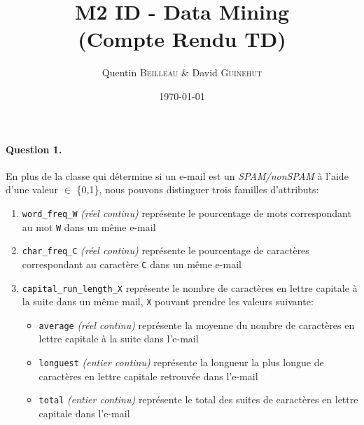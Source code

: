 \documentclass[a4paper,11pt]{article}
\title{M2 ID - Data Mining \\ \normalsize (Compte Rendu TD)}
\author{Quentin \textsc{Beilleau} \& David \textsc{Guinehut}}
\date{\today}
\begin{document}
	\renewcommand{\headrulewidth}{0.001pt}
	
	\pagestyle{fancy}
	
	\maketitle


\paragraph{Question 1.} En plus de la classe qui détermine si un e-mail est un \emph{SPAM/nonSPAM} à l'aide d'une valeur $\in$ \{0,1\}, nous pouvons distinguer trois familles d'attributs:

\begin{enumerate}
	\item \texttt{word\_freq\_W} \emph{(réel continu)} représente le pourcentage de mots correspondant au mot \texttt{W} dans un même e-mail
	\item \texttt{char\_freq\_C} \emph{(réel continu)} représente le pourcentage de caractères correspondant au caractère \texttt{C} dans un même e-mail
	\item \texttt{capital\_run\_length\_X} représente le nombre de caractères en lettre capitale à la suite dans un même mail, \texttt{X} pouvant prendre les valeurs suivante:
	\begin{itemize}
		\item \texttt{average} \emph{(réel continu)} représente la moyenne du nombre de caractères en lettre capitale à la suite dans l'e-mail
		\item \texttt{longuest} \emph{(entier continu)} représente la longueur la plus longue de caractères en lettre capitale retrouvée dans l'e-mail
		\item \texttt{total} \emph{(entier continu)} représente le total des suites de caractères en lettre capitale dans l'e-mail
	\end{itemize}
	
\end{enumerate}
\end{document}
